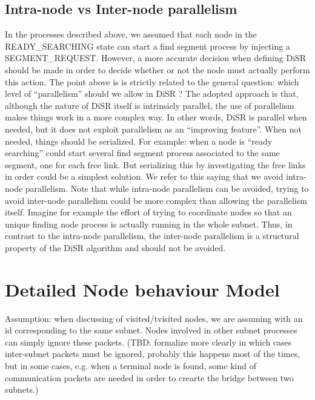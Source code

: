 \documentclass[conference]{IEEEtran}
\begin{document}
\subsection{Intra-node vs Inter-node parallelism}
In the processes described above, we assumed that each node in the
READY\_SEARCHING state can start a find segment process by injecting a
SEGMENT\_REQUEST. However, a more accurate decision when defining DiSR
should be made in order to decide whether or not the node must
actually perform this action. 
The point above is is strictly related to the general question: which
level of “parallelism” should we allow in DiSR ? The adopted approach
is that, although the nature of DiSR itself is intrinsicly parallel,
the use of parallelism makes things work in a more complex way. In
other words, DiSR is parallel when needed, but it does not exploit
parallelism as an “improving feature”. When not needed, things should
be serialized. For example: when a node is “ready searching” could
start several find segment process associated to the same segment, one
for each free link. But serializing this by investigating the free
links in order could be a simplest solution. We refer to this saying
that we avoid intra-node parallelism.  Note that while intra-node
parallelism can be avoided, trying to avoid inter-node parallelism
could be more complex than allowing the parallelism itself. Imagine
for example the effort of trying to coordinate nodes so that an unique
finding node process is actually running in the whole subnet. Thus, in
contrast to the intra-node parallelism, the inter-node parallelism is
a structural property of the DiSR algorithm and should not be avoided.

\section{Detailed Node behaviour Model}


Assumption: when discussing of visited/tvisited nodes, we are assuming
with an id corresponding to the same subnet. Nodes involved in other
subnet processes can simply ignore these packets. (TBD: formalize more
clearly in which cases inter-subnet packets must be ignored, probably
this happens most of the times, but in some cases, e.g. when a
terminal node is found, some kind of communication packets are needed
in order to crearte the bridge between two subnets.) 
\end{document}
